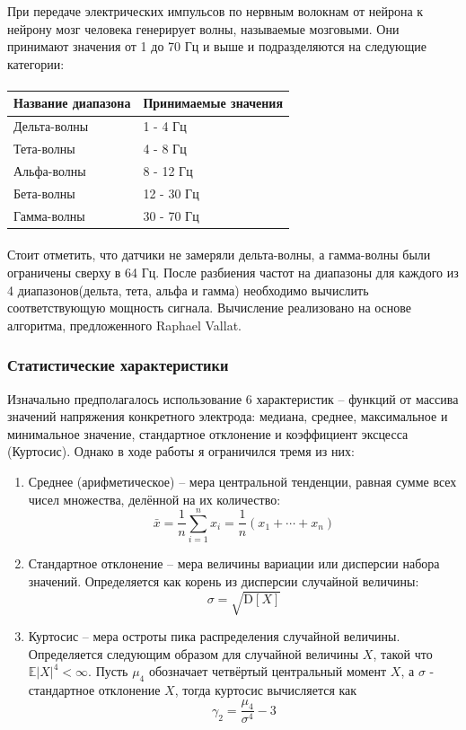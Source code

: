 \documentclass{article}
\begin{document}
При передаче электрических импульсов по нервным волокнам от нейрона к нейрону мозг человека генерирует волны, называемые мозговыми. Они принимают значения от 1 до 70 Гц и выше и подразделяются на следующие категории:

\setlength{\tabcolsep}{18pt}
\renewcommand{\arraystretch}{1.5}

\paragraph{}
\begin{tabular}{|m{5cm}|m{5cm}|}
    \hline
    \textbf{Название диапазона} & \textbf{Принимаемые значения}\\
    \hline
    Дельта-волны & 1 - 4 Гц\\
    \hline
    Тета-волны & 4 - 8 Гц\\
    \hline
    Альфа-волны & 8 - 12 Гц\\
    \hline
    Бета-волны & 12 - 30 Гц\\
    \hline
    Гамма-волны & 30 - 70 Гц\\
    \hline  
\end{tabular}
\paragraph{}

Стоит отметить, что датчики не замеряли дельта-волны, а гамма-волны были ограничены сверху в 64 Гц. После разбиения частот на диапазоны для каждого из 4 диапазонов(дельта, тета, альфа и гамма) необходимо вычислить соответствующую мощность сигнала. Вычисление реализовано на основе алгоритма, предложенного Raphael Vallat\cite{Vallat}.


\subsubsection{Статистические характеристики}
Изначально предполагалось использование 6 характеристик -- функций от массива значений напряжения конкретного электрода: медиана, среднее, максимальное и минимальное значение, стандартное отклонение и коэффициент эксцесса (Куртосис). Однако в ходе работы я ограничился тремя из них:
\begin{enumerate}
\item Среднее (арифметическое) -- мера центральной тенденции, равная сумме всех чисел множества, делённой на их количество:
$$\bar{x} = \frac{1}{n}\sum_{i=1}^n x_i  =  \frac{1}{n} (x_1+\cdots+x_n)$$
\item Стандартное отклонение -- мера величины вариации или дисперсии набора значений. Определяется как корень из дисперсии случайной величины:
$$\sigma = \sqrt{\mathrm{D}[X]}$$
\item Куртосис -- мера остроты пика распределения случайной величины. Определяется следующим образом для случайной величины $X$, такой что $\mathbb{E}|X|^4 < \infty$. Пусть $\mu_4$ обозначает четвёртый центральный момент $X$, а $\sigma$ - стандартное отклонение $X$, тогда куртосис вычисляется как $$\gamma_2 = \frac{\mu_4}{\sigma^4} - 3$$

\end{enumerate}
\end{document}
